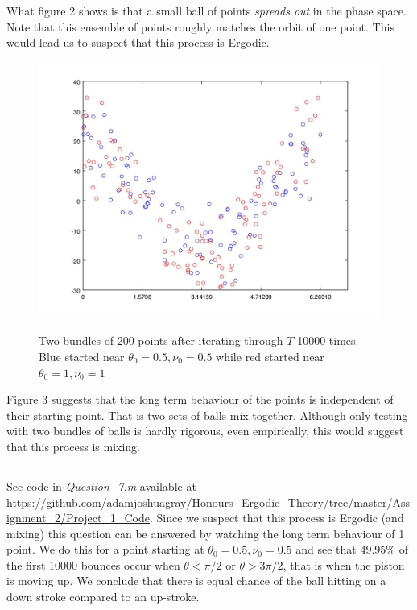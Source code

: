 \documentclass{unswmaths}
\begin{document}
What figure 2 shows is that a small ball of points \emph{spreads out} in the phase space. Note that this ensemble of points roughly matches the orbit of one point. This would lead us to suspect that this process is Ergodic. 

\clearpage
\begin{figure}[h]
    \includegraphics[scale=0.5]{Question_6_Mixing}
    \label{qn_6_mixing}
    \caption{Two bundles of 200 points after iterating through  $ T $ 10000 times. Blue started near $ \theta_0 = 0.5, \nu_0 = 0.5 $ while red started near $ \theta_0 = 1, \nu_0 = 1 $ }
\end{figure}


Figure 3 suggests that the long term behaviour of the  points is independent of their starting point. That is two sets of balls mix together. Although only testing with two bundles of balls is hardly rigorous, even empirically, this would suggest that this process is mixing.
\subsection{}

See code in \emph{Question\_7.m} available at \url{https://github.com/adamjoshuagray/Honours_Ergodic_Theory/tree/master/Assignment_2/Project_1_Code}.
Since we suspect that this process is Ergodic (and mixing) this question can be answered by watching the long term behaviour of 1 point. We do this for a point starting at $ \theta_0 = 0.5, \nu_0 = 0.5 $ and see that $ 49.95 \% $ of the first 10000 bounces occur when $ \theta < \pi / 2 $ or $ \theta > 3\pi / 2 $, that is when the piston is moving up. We conclude that there is equal chance of the ball hitting on a down stroke compared to an up-stroke.
\end{document}
